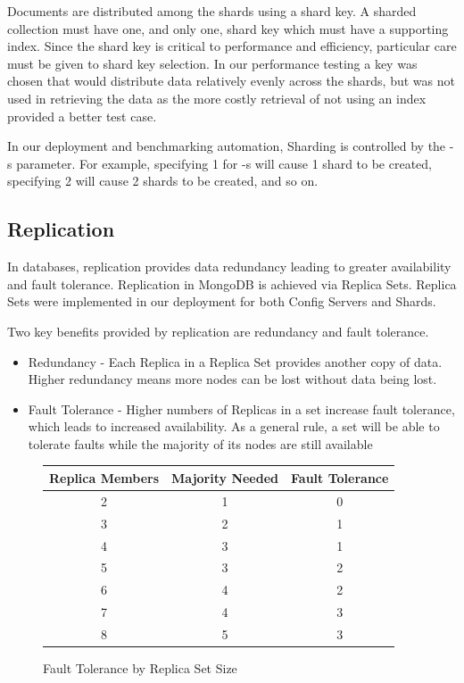\documentclass[9pt,twocolumn,twoside]{../../styles/osajnl}
\begin{document}
Documents are distributed among the shards using a shard key.  A sharded collection must have one, and only one, shard key which must have a supporting index. \cite{www-sharding}  Since the shard key is critical to performance and efficiency, particular care must be given to shard key selection. \cite{www-shardkey} In our performance testing a key was chosen that would distribute data relatively evenly across the shards, but was not used in retrieving the data as the more costly retrieval of not using an index provided a better test case.

In our deployment and benchmarking automation, Sharding is controlled by the -s parameter.  For example, specifying 1 for -s will cause 1 shard to be created, specifying 2 will cause 2 shards to be created, and so on.

\subsection{Replication}

In databases, replication provides data redundancy leading to greater availability and fault tolerance.  Replication in MongoDB is achieved via Replica Sets. \cite{www-replication}  Replica Sets were implemented in our deployment for both Config Servers and Shards.

Two key benefits provided by replication are redundancy and fault tolerance.
\vspace{-\topsep}
\begin{itemize}
\item Redundancy - Each Replica in a Replica Set provides another copy of data.  Higher redundancy means more nodes can be lost without data being lost.
\item Fault Tolerance - Higher numbers of Replicas in a set increase fault tolerance, which leads to increased availability.  As a general rule, a set will be able to tolerate faults while the majority of its nodes are still available
\end{itemize}
\vspace{-\topsep}

\begin{figure}[ht]
\begin{center}
 \begin{tabular}{|c | c | c|} 
 \hline
Replica Members &  Majority Needed & Fault Tolerance \\ [0.5ex] 
 \hline\hline
    
2 &	1 &	0 \\
 \hline
3 &	2 &	1 \\ 
 \hline
4 &	3 &	1 \\ 
 \hline
5 &	3 &	2 \\ 
 \hline
6 &	4 &	2\\ 
 \hline
7 &	4 &	3\\ 
 \hline
8 &	5 &	3\\ [1ex] 
 \hline
\end{tabular}
\end{center}
  \caption{Fault Tolerance by Replica Set Size} \cite{www-mongoRepDep}
\end{figure}
\end{document}
